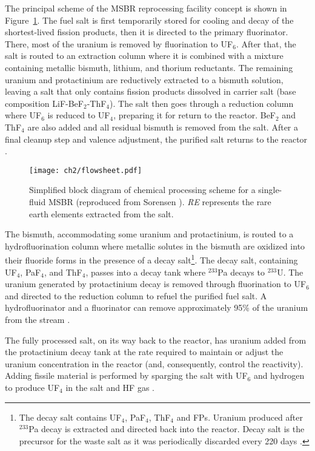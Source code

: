 The principal scheme of the \gls{MSBR} reprocessing facility concept is shown 
in Figure~\ref{fig:material_flow}. The fuel salt is first temporarily stored 
for cooling and decay of the shortest-lived fission products, then it is 
directed to the primary fluorinator. There, most of the uranium is removed by 
fluorination to UF$_6$. After that, the salt is routed to an extraction column 
where it is combined with a mixture containing metallic bismuth, lithium, and 
thorium reductants. The remaining uranium and protactinium are reductively 
extracted to a bismuth solution, leaving a salt that only contains fission 
products dissolved in carrier salt (base composition LiF-BeF$_2$-ThF$_4$). The 
salt then goes through a reduction column where UF$_6$ is reduced to UF$_4$,  
preparing it for return to the reactor. BeF$_2$ and ThF$_4$ are also added and 
all residual bismuth is removed from the salt. After a final cleanup step and  
valence adjustment, the purified salt returns to the reactor 
\cite{carter_design_1972, sorensen_one-fluid_2006}.
\begin{figure}[htp!] %
	\centering
	\texttt{[image: ch2/flowsheet.pdf]}
	\caption{Simplified block diagram of chemical processing scheme for 
	a single-fluid \gls{MSBR} (reproduced from Sorensen 
		\cite{sorensen_one-fluid_2006}). \emph{RE} represents the rare 
		earth elements extracted from the salt.}
	\label{fig:material_flow}
\end{figure}

The bismuth, accommodating some uranium and protactinium, is routed to a 
hydrofluorination column where metallic solutes in the bismuth are oxidized 
into their fluoride forms in the presence of a decay salt\footnote{The decay 
salt contains UF$_4$, PaF$_4$, ThF$_4$ and \glspl{FP}. Uranium produced 
after $^{233}$Pa decay is extracted and directed back into the reactor. Decay 
salt is the precursor for the waste salt as it was periodically discarded  
every 220 days \cite{robertson_conceptual_1971}.}. The decay salt, containing 
UF$_4$, PaF$_4$, and ThF$_4$, passes into a decay tank where $^{233}$Pa 
decays to $^{233}$U. The uranium generated by protactinium decay is removed 
through fluorination to UF$_6$ and directed to the reduction column to refuel 
the purified fuel salt. A  hydrofluorinator and a fluorinator can remove 
approximately 95\% of the uranium from the stream 
\cite{robertson_conceptual_1971}.

The fully processed salt, on its way back to the reactor, has uranium added 
from the protactinium decay tank at the rate required to maintain or adjust 
the uranium concentration in the reactor (and, consequently, control the 
reactivity). Adding fissile material is performed by sparging the salt with 
UF$_6$ and hydrogen to produce UF$_4$ in the salt and HF gas 
\cite{robertson_conceptual_1971}.

